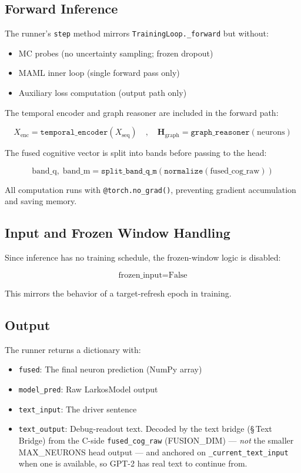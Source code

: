 \documentclass[12pt]{article}
\begin{document}
\subsection{Forward Inference}

The runner's \texttt{step} method mirrors \texttt{TrainingLoop.\_forward}
but without:

\begin{itemize}
  \item MC probes (no uncertainty sampling; frozen dropout)
  \item MAML inner loop (single forward pass only)
  \item Auxiliary loss computation (output path only)
\end{itemize}

The temporal encoder and graph reasoner are included in the forward path:

\[
  X_{\text{enc}} = \texttt{temporal\_encoder}(X_{\text{seq}})
  \quad,\quad
  \mathbf{H}_{\text{graph}} = \texttt{graph\_reasoner}(\text{neurons})
\]

The fused cognitive vector is split into bands before passing to the head:

\[
  \text{band\_q},\; \text{band\_m} =
    \texttt{split\_band\_q\_m}(\texttt{normalize}(\text{fused\_cog\_raw}))
\]

All computation runs with \texttt{@torch.no\_grad()}, preventing gradient
accumulation and saving memory.

\subsection{Input and Frozen Window Handling}

Since inference has no training schedule, the frozen-window logic is
disabled:

\[
  \text{frozen\_input} = \text{False}
\]

This mirrors the behavior of a target-refresh epoch in training.

\subsection{Output}

The runner returns a dictionary with:

\begin{itemize}
  \item \texttt{fused}: The final neuron prediction (NumPy array)
  \item \texttt{model\_pred}: Raw LarkosModel output
  \item \texttt{text\_input}: The driver sentence
  \item \texttt{text\_output}: Debug-readout text. Decoded by the text
    bridge (\S\,Text Bridge) from the C-side \texttt{fused\_cog\_raw}
    (FUSION\_DIM) — \emph{not} the smaller MAX\_NEURONS head output —
    and anchored on \texttt{\_current\_text\_input} when one is
    available, so GPT-2 has real text to continue from.
\end{itemize}
\end{document}
